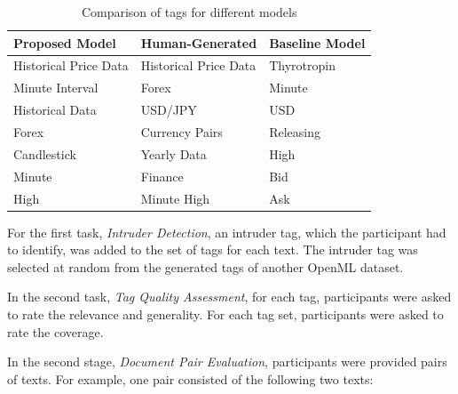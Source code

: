\begin{table}[h]
    \centering
    \begin{tabular}{|>{\raggedright\arraybackslash}p{4cm}|>{\raggedright\arraybackslash}p{4cm}|>{\raggedright\arraybackslash}p{4cm}|}
        \hline
        \textbf{Proposed Model} & \textbf{Human-Generated} & \textbf{Baseline Model} \\ \hline
        Historical Price Data   & Historical Price Data    & Thyrotropin             \\ \hline
        Minute Interval         & Forex                    & Minute                  \\ \hline
        Historical Data         & USD/JPY                  & USD                     \\ \hline
        Forex                   & Currency Pairs           & Releasing               \\ \hline
        Candlestick             & Yearly Data              & High                    \\ \hline
        Minute                  & Finance                  & Bid                     \\ \hline
        High                    & Minute High              & Ask                     \\ \hline
    \end{tabular}
    \caption{Comparison of tags for different models}
    \label{tab:tag_comparison}
\end{table}

For the first task, \textit{Intruder Detection}, an intruder tag, which the participant had to identify, was added to the set of tags for each text. The intruder tag was selected at random from the generated tags of another OpenML dataset.

In the second task, \textit{Tag Quality Assessment}, for each tag, participants were asked to rate the relevance and generality. For each tag set, participants were asked to rate the coverage.

In the second stage, \textit{Document Pair Evaluation}, participants were provided pairs of texts. For example, one pair consisted of the following two texts:

